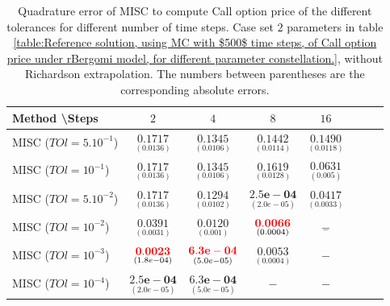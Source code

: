 \documentclass[11pt]{article}
\begin{document}
\begin{table}[h!]
	\centering
	\begin{tabular}{l*{6}{c}r}
		Method \textbackslash  Steps            & $2$ & $4$ & $8$ & $16$  \\
		\hline
		MISC ($TOl=5.10^{-1}$)  & $\underset{(    0.0136)}{\mathbf{    0.1717}}$ & $\underset{(   0.0106)}{\mathbf{   0.1345}}$ & $\underset{(0.0114
			)}{\mathbf{0.1442
		}}$ & $\underset{(0.0118)}{\mathbf{0.1490}}$  \\
		MISC ($TOl=10^{-1}$)  & $\underset{(    0.0136)}{\mathbf{    0.1717}}$ & $\underset{(   0.0106)}{\mathbf{   0.1345}}$ & $\underset{(0.0128)}{\mathbf{0.1619}}$ & $\underset{(0.005)}{\mathbf{0.0631}}$  \\
			MISC ($TOl=5.10^{-2}$)  &$\underset{(    0.0136)}{\mathbf{    0.1717}}$ & $\underset{(   0.0102
				)}{\mathbf{    0.1294}}$ & $\underset{(2.0e-05)}{\mathbf{2.5e-04}}$ & $\underset{(0.0033)}{\mathbf{0.0417}}$  \\
	MISC ($TOl=10^{-2}$)  & $\underset{(    0.0031)}{\mathbf{0.0391
	}}$ & $\underset{(0.001)}{\mathbf{  0.0120}}$ & $\underset{(0.0004)}{\mathbf{{\color{red}0.0066}}}$ & $\underset{-}{\mathbf{-}}$  \\
		MISC ($TOl=10^{-3}$)        & $\underset{(
			1.8e-04)}{\mathbf{   {\color{red}0.0023}
		}}$  &$\underset{(5.0e-05)}{\mathbf{{\color{red}6.3e-04}}}$  &  $\underset{(0.0004)}{\mathbf{0.0053}}$ &  $-$ \\
	MISC ($TOl=10^{-4}$)        & $\underset{(2.0e-05)}{\mathbf{2.5e-04}} $ &$\underset{(5.0e-05)}{\mathbf{6.3e-04}}$ &  $-$ &  $-$ \\	
		
		\hline
	\end{tabular}
	\caption{Quadrature error of MISC to compute Call option price of the different tolerances for different number of time steps. Case  set $2$ parameters in table \ref{table:Reference solution, using MC with $500$ time steps, of Call option price under rBergomi model, for different parameter constellation.}, without Richardson extrapolation. The numbers between parentheses are the corresponding absolute errors.}
	\label{Quadrature error of MISC to compute Call option price of the different tolerances for different number of time steps. Case  set $2$ parameters, without Richardson extrapolation. The numbers between parentheses are the corresponding absolute errors.}
\end{table}
\end{document}
